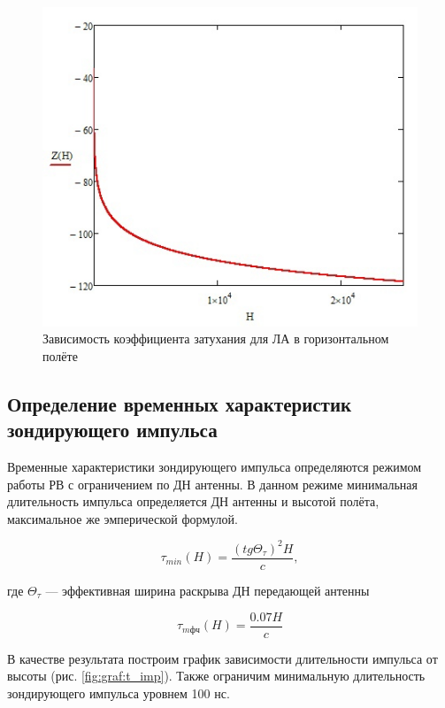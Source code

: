 \documentclass[utf8x, 14pt, oneside, a4paper]{article}
\begin{document}
			\begin{figure}[H]
				\centering
				\includegraphics[width=0.7\linewidth]{"Рисунки/Графики/Коэффициент затухания 2Д"}
				\caption{Зависимость коэффициента затухания для ЛА в горизонтальном полёте}
				\label{fig:graf:Beta_2D}
			\end{figure}
			
		
		\subsection{Определение временных характеристик зондирующего импульса}
			Временные характеристики зондирующего импульса определяются режимом работы РВ с ограничением по ДН антенны. В данном режиме минимальная длительность импульса определяется ДН антенны и высотой полёта, максимальное же эмперической формулой.
			
			\begin{equation}
				\label{eq:t_min}
				\tau_{min}(H)=\frac{(tg\Theta_{\tau})^{2}H}{c},
			\end{equation}
		
			где $\Theta_{\tau}$ --- эффективная ширина раскрыва ДН передающей антенны
		
			\begin{equation}
				\label{eq:t_max}
				\tau_{mфч}(H)=\frac{0.07H}{c}
			\end{equation}
			
			В качестве результата построим график зависимости длительности импульса от высоты (рис. \ref{fig:graf:t_imp}). Также ограничим минимальную длительность зондирующего импульса уровнем 100 нс.
			
\end{document}

